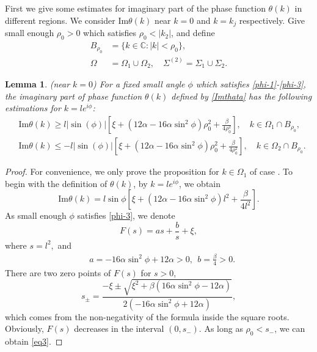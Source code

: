 \documentclass[11pt]{article}
\numberwithin{equation}{section}
\newtheorem{lemma}{Lemma}
\begin{document}
First we give some estimates for imaginary part of the phase function $\theta(k)$ in different regions. We consider $\mathrm{Im}\theta(k)$ near $k=0$ and $k=k_j$ respectively.
Give small enough $\rho_0>0$ which satisfies $\rho_0<|k_2|$, and define
\begin{align}
B_{\rho_0}&=\{k\in\mathbb{C}:|k|<\rho_0\},\\
   \Omega &=\Omega_1\cup\Omega_2,\quad \Sigma^{(2)} =\Sigma_1\cup\Sigma_2.\label{eq13}
\end{align}
\begin{lemma}\label{p9}\textup{(}near $k=0$\textup{)}
    For a fixed small angle $\phi$ which satisfies \ref{phi-1}-\ref{phi-3}, the imaginary part of phase function $\theta(k)$ defined by \eqref{Imthata} has the following estimations for $k=le^{i\phi}$:
    \begin{align}
        &\mathrm{Im}\theta(k)\geqslant l|\sin(\phi)|\left[\xi+(12\alpha-16\alpha \sin^2\phi)\rho_0^2+\frac{\beta}{4\rho_0^2}\right],\quad k\in\Omega_{1}\cap B_{\rho_0},\label{eq3}\\
        &\mathrm{Im}\theta(k)\leqslant -l|\sin(\phi)|\left[\xi+(12\alpha-16\alpha \sin^2\phi)\rho_0^2+\frac{\beta}{4\rho_0^2}\right],\quad k\in\Omega_{2}\cap B_{\rho_0}.
    \end{align}
\end{lemma}
\begin{proof}
    For convenience, we only prove the proposition for $k\in\Omega_{1}$ of case \uppercase\expandafter{}. To begin with the definition of $\theta(k)$, by $k=le^{i\phi}$, we obtain \begin{equation*}
        \mathrm{Im}\theta(k)=l\sin\phi\left[\xi+(12\alpha-16\alpha \sin^2\phi)l^2+\frac{\beta}{4l^2}\right].
    \end{equation*}
    As small enough $\phi$ satisfies \ref{phi-3}, we denote
    \begin{equation*}
        F(s)=as+\frac{b}{s}+\xi,
    \end{equation*}
    where $s=l^2,$ and
    \begin{align*}
        &a=-16\alpha\sin^2\phi+12\alpha>0,\ \
      b=\frac{\beta}{4}>0.
    \end{align*}
There are two zero points of $F(s)$ for $s>0$,
\begin{equation*}
    s_{\pm}=\frac{-\xi\pm\sqrt{\xi^2+\beta(16\alpha\sin^2\phi-12\alpha)}}{2(-16\alpha\sin^2\phi+12\alpha)},
\end{equation*}
which comes from the non-negativity of the formula inside the square roots. Obviously, $F(s)$ decreases in the interval $(0,s_-)$. As long as $\rho_0<s_-$, we can obtain \eqref{eq3}.

\end{proof}
\end{document}
